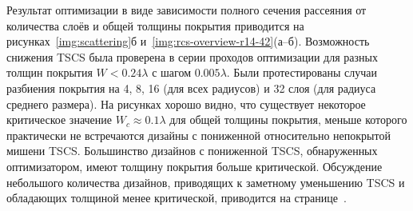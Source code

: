 Результат оптимизации в виде зависимости полного сечения рассеяния от
количества слоёв и общей толщины покрытия приводится на
рисунках~\ref{img:scattering}б
и~\ref{img:rcs-overview-r14-42}(а--б). Возможность снижения TSCS была
проверена в серии проходов оптимизации для разных толщин
покрытия ${W < 0.24\lambda}$ с шагом $0.005\lambda$. Были
протестированы случаи разбиения покрытия на 4, 8, 16 (для всех
радиусов) и 32 слоя (для радиуса среднего размера). На рисунках хорошо
видно, что существует некоторое критическое значение
${W_c \approx 0.1\lambda}$ для общей толщины покрытия, меньше которого
практически не встречаются дизайны с пониженной относительно
непокрытой мишени TSCS. Большинство дизайнов с пониженной TSCS, обнаруженных
оптимизатором, имеют толщину покрытия больше критической. Обсуждение
небольшого количества дизайнов, приводящих к заметному уменьшению TSCS
и обладающих толщиной менее критической, приводится на
странице~\pageref{ref:thin-designs}\label{backref:thin-designs}.


